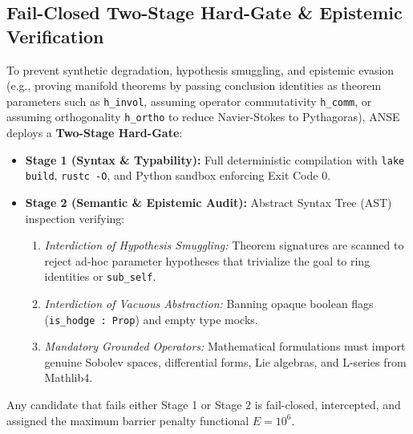 \subsection{Fail-Closed Two-Stage Hard-Gate \& Epistemic Verification}
To prevent synthetic degradation, hypothesis smuggling, and epistemic evasion (e.g., proving manifold theorems by passing conclusion identities as theorem parameters such as \texttt{h\_invol}, assuming operator commutativity \texttt{h\_comm}, or assuming orthogonality \texttt{h\_ortho} to reduce Navier-Stokes to Pythagoras), ANSE deploys a \textbf{Two-Stage Hard-Gate}:

\begin{itemize}
    \item \textbf{Stage 1 (Syntax \& Typability):} Full deterministic compilation with \texttt{lake build}, \texttt{rustc -O}, and Python sandbox enforcing Exit Code 0.
    \item \textbf{Stage 2 (Semantic \& Epistemic Audit):} Abstract Syntax Tree (AST) inspection verifying:
    \begin{enumerate}
        \item \textit{Interdiction of Hypothesis Smuggling:} Theorem signatures are scanned to reject ad-hoc parameter hypotheses that trivialize the goal to ring identities or \texttt{sub\_self}.
        \item \textit{Interdiction of Vacuous Abstraction:} Banning opaque boolean flags (\texttt{is\_hodge : Prop}) and empty type mocks.
        \item \textit{Mandatory Grounded Operators:} Mathematical formulations must import genuine Sobolev spaces, differential forms, Lie algebras, and L-series from Mathlib4.
    \end{enumerate}
\end{itemize}
Any candidate that fails either Stage 1 or Stage 2 is fail-closed, intercepted, and assigned the maximum barrier penalty functional $E = 10^6$.

\newpage
